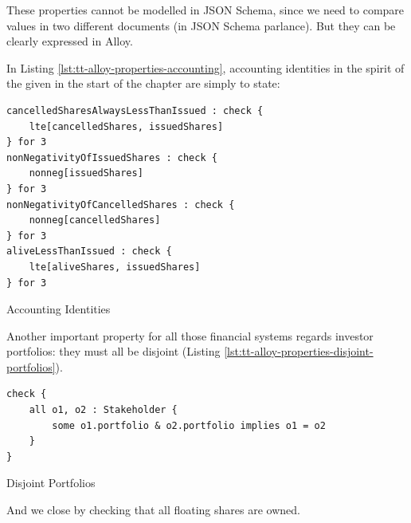 %

{These properties cannot be modelled in JSON Schema, since we need to compare values in two different documents (in JSON Schema parlance).} But they can be clearly expressed in Alloy.

In Listing \ref{lst:tt-alloy-properties-accounting}, accounting identities in the spirit of the given in the start of the chapter are simply to state: 

\begin{listing}[!h]
	\begin{verbatim}
cancelledSharesAlwaysLessThanIssued : check {
    lte[cancelledShares, issuedShares]
} for 3
nonNegativityOfIssuedShares : check {
    nonneg[issuedShares]
} for 3
nonNegativityOfCancelledShares : check {
    nonneg[cancelledShares]
} for 3
aliveLessThanIssued : check {
    lte[aliveShares, issuedShares]
} for 3
\end{verbatim}
	\caption{Accounting Identities}
\label{lst:tt-alloy-properties-accounting}
\end{listing}

Another important property for all those financial systems regards investor portfolios: they must all be disjoint (Listing \ref{lst:tt-alloy-properties-disjoint-portfolios}).

\begin{listing}[!h]
	\begin{verbatim}
check {
    all o1, o2 : Stakeholder {
        some o1.portfolio & o2.portfolio implies o1 = o2
    }
}
\end{verbatim}
	\caption{Disjoint Portfolios}
\label{lst:tt-alloy-properties-disjoint-portfolios}
\end{listing}

And we close by checking that all floating shares are owned. 

